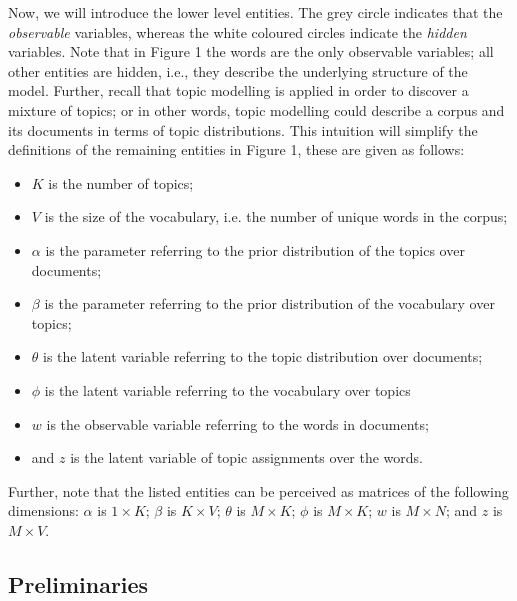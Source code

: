 \documentclass{mprop}
\begin{document}
\par Now, we will introduce the lower level entities. The grey circle indicates that the \textit{observable} variables, whereas the white coloured circles indicate the \textit{hidden} variables. Note that in Figure 1 the words are the only observable variables; all other entities are hidden, i.e., they describe the underlying structure of the model. Further, recall that topic modelling is applied in order to discover a mixture of topics; or in other words, topic modelling could describe a corpus and its documents in terms of topic distributions. This intuition will simplify the definitions of the remaining entities in Figure 1, these are given as follows:
\begin{itemize}
\item $K$ is the number of topics;
\item $V$ is the size of the vocabulary, i.e. the number of unique words in the corpus;
\item $\alpha$ is the parameter referring to the prior distribution of the topics over documents;
\item $\beta$ is the parameter referring to the prior distribution of the vocabulary over topics;
\item $\theta$ is the latent variable referring to the topic distribution over documents;
\item $\phi$ is the latent variable referring to the vocabulary over topics
\item $w$ is the observable variable referring to the words in documents;
\item and $z$ is the latent variable of topic assignments over the words.
\end{itemize}
Further, note that the listed entities can be perceived as matrices of the following dimensions: $\alpha$ is $1 \times K$; $\beta$ is $K \times V$; $\theta$ is $M \times K$; $\phi$ is $M \times K$; $w$ is $M \times N$; and $z$ is $M \times V$.

\subsection{Preliminaries}
\end{document}

